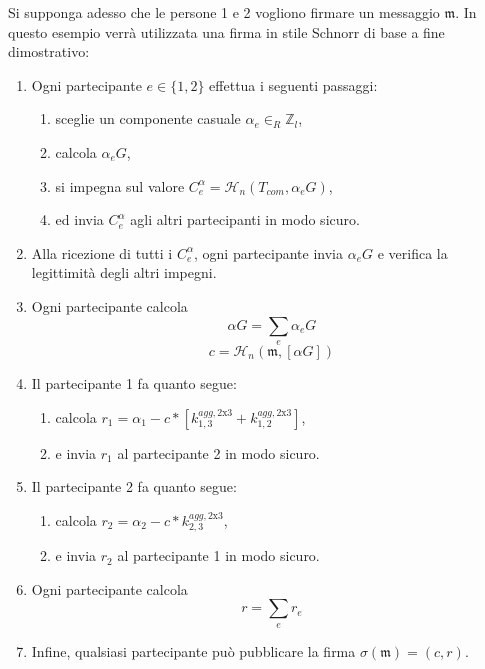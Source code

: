 Si supponga adesso che le persone 1 e 2 vogliono firmare un messaggio $\mathfrak{m}$. In questo esempio verrà utilizzata una firma in stile Schnorr di base a fine dimostrativo:
\begin{enumerate}
    \item Ogni partecipante $e \in \{1,2\}$ effettua i seguenti passaggi:
    \begin{enumerate}
        \item sceglie un componente casuale $\alpha_e \in_R \mathbb{Z}_l$,
        \item calcola $\alpha_e G$,
        \item si impegna sul valore $C^{\alpha}_{e} = \mathcal{H}_n(T_{com},\alpha_e G)$,
        \item ed invia $C^{\alpha}_{e}$ agli altri partecipanti in modo sicuro.
    \end{enumerate}
    \item Alla ricezione di tutti i $C^{\alpha}_{e}$, ogni partecipante invia $\alpha_e G$ e verifica la legittimità degli altri impegni.
    \item Ogni partecipante calcola
    \[\alpha G = \sum_e \alpha_e G\]
    \[c = \mathcal{H}_n(\mathfrak{m},[\alpha G])\]
    \item Il partecipante 1 fa quanto segue:
    \begin{enumerate}
        \item calcola $r_1 = \alpha_1 - c*[k^{agg,\textrm{2x3}}_{1,3} + k^{agg,\textrm{2x3}}_{1,2}]$,
        \item e invia $r_1$ al partecipante 2 in modo sicuro.
    \end{enumerate}
    \item Il partecipante 2 fa quanto segue:
    \begin{enumerate}
        \item calcola $r_2 = \alpha_2 - c*k^{agg,\textrm{2x3}}_{2,3}$,
        \item e invia $r_2$ al partecipante 1 in modo sicuro.
    \end{enumerate}
    \item Ogni partecipante calcola
    \[r = \sum_e r_e\]
    \item Infine, qualsiasi partecipante può pubblicare la firma $\sigma(\mathfrak{m}) = (c,r)$.
\end{enumerate}

